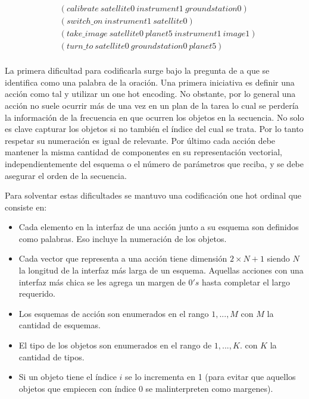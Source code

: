 \begin{align*}
    & (calibrate\ satellite0\ instrument1\ groundstation0) \\
    & (switch\_on\ instrument1\ satellite0) \\
    & (take\_image\ satellite0\ planet5\ instrument1\ image1) \\
    & (turn\_to\ satellite0\ groundstation0\ planet5) \\
\end{align*}

La primera dificultad para codificarla surge bajo la pregunta de a que se
identifica como una palabra de la oración. Una primera iniciativa es definir una
acción como tal y utilizar un one hot encoding. No obstante, por lo general
una acción no suele ocurrir más de una vez en un plan de la tarea lo cual se
perdería la información de la frecuencia en que ocurren los objetos en la
secuencia. No solo es clave capturar los objetos si no también el índice del
cual se trata. Por lo tanto respetar su numeración es igual de relevante. Por
último cada acción debe mantener la misma cantidad de componentes en su
representación vectorial, independientemente del esquema o el número de
parámetros que reciba, y se debe asegurar el orden de la secuencia.

Para solventar estas dificultades se mantuvo una codificación one hot ordinal que
consiste en:

\begin{itemize}
    \item Cada elemento en la interfaz de una acción junto a su esquema son
    definidos como palabras. Eso incluye la numeración de los objetos.
    \item Cada vector que representa a una acción tiene dimensión $2 \times N +
    1$ siendo $N$ la longitud de la interfaz más larga de un esquema. Aquellas
    acciones con una interfaz más chica se les agrega un margen de $0's$ hasta
    completar el largo requerido.
    \item Los esquemas de acción son enumerados en el rango $1, ..., M$ con $M$
    la cantidad de esquemas.
    \item El tipo de los objetos son enumerados en el rango de $1, ..., K$. con
    $K$ la cantidad de tipos.
    \item Si un objeto tiene el índice $i$ se lo incrementa en 1 (para evitar que
    aquellos objetos que empiecen con índice 0 se malinterpreten como margenes).
\end{itemize}

